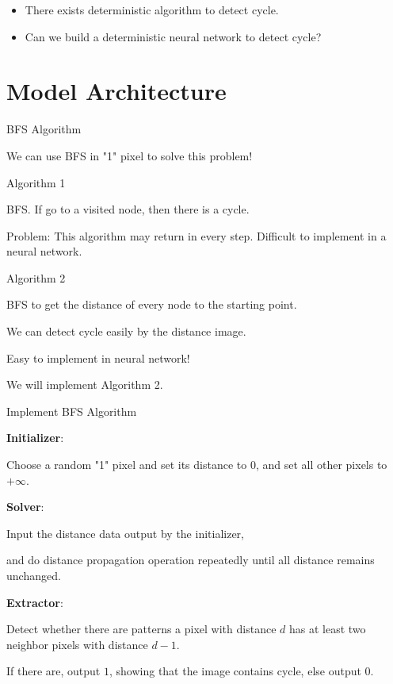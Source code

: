 \documentclass[serif]{beamer}
\begin{document}
\begin{frame}

	\begin{itemize}

		\item There exists deterministic algorithm to detect cycle.

		\item Can we build a deterministic neural network to detect cycle?

	\end{itemize}

\end{frame}

\section{Model Architecture}

\begin{frame}{BFS Algorithm}

	We can use BFS in "1" pixel to solve this problem!

	\begin{block}{Algorithm 1}

		BFS. If go to a visited node, then there is a cycle.

	\end{block}

	Problem: This algorithm may return in every step. Difficult to implement in a neural network.

	\begin{block}{Algorithm 2}

		BFS to get the distance of every node to the starting point.

		We can detect cycle easily by the distance image.

	\end{block}

	Easy to implement in neural network!

	We will implement Algorithm 2.


\end{frame}

\begin{frame}{Implement BFS Algorithm}

	\textbf{Initializer}:

	Choose a random "1" pixel and set its distance to $0$, and set all other pixels to $+\infty$.

	\textbf{Solver}:

	Input the distance data output by the initializer,

	and do distance propagation operation repeatedly until all distance remains unchanged.

	\textbf{Extractor}:

	Detect whether there are patterns a pixel with distance $d$ has at least two neighbor pixels with distance $d-1$.

	If there are, output $1$, showing that the image contains cycle, else output $0$.

\end{frame}
\end{document}
